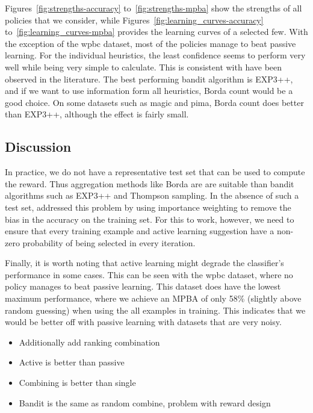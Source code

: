 \documentclass[fleqn,10pt,lineno]{wlpeerj} %
\begin{document}
Figures~\ref{fig:strengths-accuracy} to~\ref{fig:strengths-mpba} show the
strengths of all policies that we consider, while
Figures~\ref{fig:learning_curves-accuracy} to~\ref{fig:learning_curves-mpba}
provides the learning curves of a selected few. With the exception of the wpbc
dataset, most of the policies manage to beat passive learning. For the
individual heuristics, the least confidence seems to perform very well while
being very simple to calculate. This is consistent with have been observed in
the literature. The best performing bandit algorithm is EXP3++, and if we want
to use information form all heuristics, Borda count would be a good choice. On
some datasets such as magic and pima, Borda count does better than EXP3++,
although the effect is fairly small.

\subsection{Discussion}

In practice, we do not have a representative test set that can be used to
compute the reward. Thus aggregation methods like Borda are are suitable than
bandit algorithms such as EXP3++ and Thompson sampling. In the absence of such
a test set, \cite{hsu15} addressed this problem by using importance weighting
to remove the bias in the accuracy on the training set. For this to work,
however, we need to ensure that every training example and active learning
suggestion have a non-zero probability of being selected in every iteration.

Finally, it is worth noting that active learning might degrade the classifier's
performance in some cases. This can be seen with the wpbc dataset, where no
policy manages to beat passive learning. This dataset does have the lowest
maximum performance, where we achieve an MPBA of only 58\% (slightly above
random guessing) when using the all examples in training. This indicates that
we would be better off with passive learning with datasets that are very noisy.

\begin{itemize}
	\item Additionally add ranking combination
	\item Active is better than passive
	\item Combining is better than single
	\item Bandit is the same as random combine, problem with reward design
\end{itemize}
\end{document}
